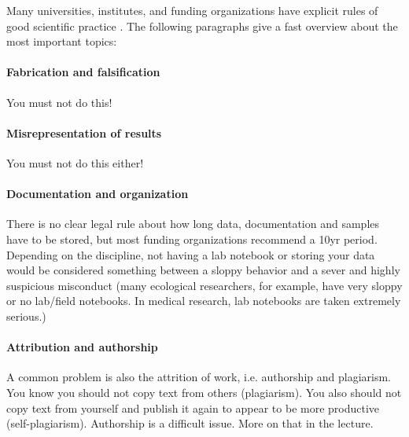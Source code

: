 \documentclass{tufte-book}
\begin{document}
Many
 universities, institutes, and funding organizations have explicit rules of good scientific practice \citet[e.g.][]{Forschungsgemeinschaft-RulesGoodScientific-2013}. The following paragraphs give a fast overview about the most important topics:


\paragraph{Fabrication and falsification} You must not do this!

\paragraph{Misrepresentation of results} You must not do this either!

\paragraph{Documentation and organization} There is no clear legal rule about how long data, documentation and samples have to be stored, but most funding organizations recommend a 10yr period. Depending on the discipline, not having a lab notebook or storing your data would be considered something between a sloppy behavior and a sever and highly suspicious misconduct (many ecological researchers, for example, have very sloppy or no lab/field notebooks. In medical research, lab notebooks are taken extremely serious.)

\paragraph{Attribution and authorship} A common problem is also the attrition of work, i.e. authorship and plagiarism. You know you should not copy text from others (plagiarism). You also should not copy text from yourself and publish it again to appear to be more productive (self-plagiarism). Authorship is a difficult issue. More on that in the lecture. 
\end{document}
